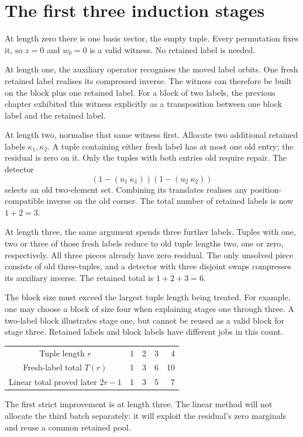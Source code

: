 \documentclass[11pt,a4paper,oneside,openany]{book}
\theoremstyle{definition}\newtheorem{definition}[theorem]{Definition}
\theoremstyle{remark}\newtheorem{remark}[theorem]{Remark}
\numberwithin{equation}{chapter}
\begin{document}
\section{The first three induction stages}
At length zero there is one basis vector, the empty tuple. Every
permutation fixes it, so $z=0$ and $w_0=0$ is a valid witness. No
retained label is needed.

At length one, the auxiliary operator recognises the moved label
orbits. One fresh retained label realises its compressed inverse.
The witness can therefore be built on the block plus one retained
label. For a block of two labels, the previous chapter exhibited
this witness explicitly as a transposition between one block label
and the retained label.

At length two, normalise that same witness first. Allocate two
additional retained labels $\kappa_1,\kappa_2$. A tuple containing
either fresh label has at most one old entry; the residual is zero
on it. Only the tuples with both entries old require repair. The
detector
\[
                 (1-(u_1\ \kappa_1))(1-(u_2\ \kappa_2))
\]
selects an old two-element set. Combining its translates realises
any position-compatible inverse on the old corner. The total number
of retained labels is now $1+2=3$.

At length three, the same argument spends three further labels.
Tuples with one, two or three of those fresh labels reduce to old
tuple lengths two, one or zero, respectively. All three pieces
already have zero residual. The only unsolved piece consists of
old three-tuples, and a detector with three disjoint swaps compresses
its auxiliary inverse. The retained total is $1+2+3=6$.

The block size must exceed the largest tuple length being treated.
For example, one may choose a block of size four when explaining
stages one through three. A two-label block illustrates stage one,
but cannot be reused as a valid block for stage three. Retained
labels and block labels have different jobs in this count.

\begin{center}
\begin{tabular}{@{}c|rrrr@{}}
Tuple length $r$ &1&2&3&4\\
Fresh-label total $T(r)$ &1&3&6&10\\
Linear total proved later $2r-1$ &1&3&5&7
\end{tabular}
\end{center}
The first strict improvement is at length three. The linear method
will not allocate the third batch separately: it will exploit the
residual's zero marginals and reuse a common retained pool.
\end{document}
